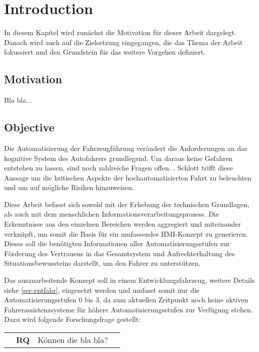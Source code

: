 \section{Introduction}
In diesem Kapitel wird zunächst die Motivation für dieser Arbeit dargelegt. Danach wird auch auf die Zielsetzung eingegangen, die das Thema der Arbeit fokussiert und den Grundstein für das weitere Vorgehen definiert.

\subsection{Motivation} \label{sec:#Motivation}
Bla bla...


\subsection{Objective} \label{sec:#}
\glqq Die Automatisierung der Fahrzeugführung verändert die Anforderungen an das kognitive System des Autofahrers grundlegend. Um daraus keine Gefahren entstehen zu lassen, sind noch zahlreiche Fragen offen.\grqq{} \cite{schlott}. Schlott trifft diese Aussage um die kritischen Aspekte der hochautomatisierten Fahrt zu beleuchten und um auf mögliche Risiken hinzuweisen. 

Diese Arbeit befasst sich sowohl mit der Erhebung der technischen Grundlagen, als auch mit dem menschlichen Informationsverarbeitungsprozess. Die Erkenntnisse aus den einzelnen Bereichen werden aggregiert und miteinander verknüpft, um somit die Basis für ein umfassendes HMI-Konzept zu generieren. Dieses soll die benötigten Informationen aller Automatisierungsstufen zur Förderung des Vertrauens in das Gesamtsystem und Aufrechterhaltung des Situationsbewussteins darstellt, um den Fahrer zu unterstützen. 

Das auszuarbeitende Konzept soll in einem Entwicklungsfahrzeug, weitere Details siehe \autoref{sec:entfahr}, eingesetzt werden und umfasst somit nur die Automatisierungsstufen 0 bis 3, da zum aktuellen Zeitpunkt noch keine aktiven Fahrerassistenzsysteme für höhere Automatisierungsstufen zur Verfügung stehen. Dazu wird folgende Forschungsfrage gestellt: \\

\begin{tabular}{p{0.3cm} p{0.5cm} p{13cm} p{0.5cm}}
	& \textbf{RQ}	& Können die bla bla? & \\
\end{tabular}
\vspace{1em} 

